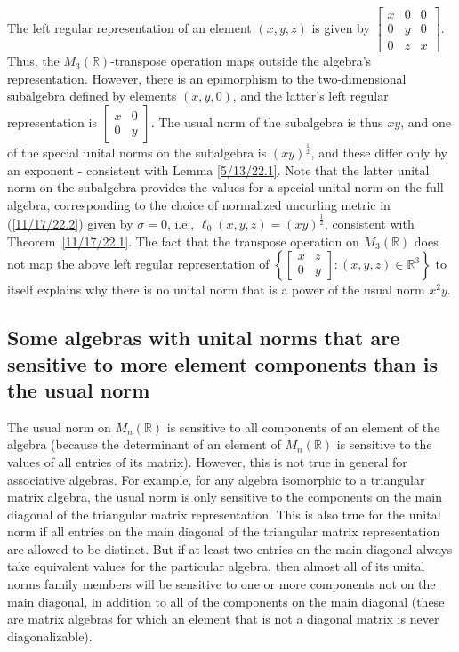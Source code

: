 \documentclass{amsart}
\theoremstyle{definition}
\numberwithin{theorem}{section}
\numberwithin{equation}{section}
\begin{document}
The left regular representation of an element $(x,y,z)$ is given by $\left[\begin{array}{ccc}
x & 0 & 0   \\
 0 & y & 0 \\ 0 & z & x    
\end{array} \right]$.  Thus, the $M_3(\mathbb{R})$-transpose operation maps outside the algebra's representation.  However, there is an epimorphism to the two-dimensional subalgebra defined by elements $(x,y,0)$, and the latter's left regular representation is 
 $\left[\begin{array}{ccc}
x & 0  \\
 0 & y  
\end{array} \right]$.  The usual norm of the subalgebra is thus $xy$, and one of the special unital norms on the subalgebra is $(xy)^{\frac{1}{2}}$, and these differ only by an exponent - consistent with Lemma \ref{5/13/22.1}.   Note that the latter unital norm on the subalgebra provides the values for a special unital norm on the full algebra, corresponding to the choice of normalized uncurling metric in (\ref{11/17/22.2}) given by $\sigma = 0$, i.e., $\ell_0(x,y,z) = (xy)^{\frac{1}{2}}$, consistent with \mbox{Theorem \ref{11/17/22.1}}.  The fact that the transpose operation on $M_3(\mathbb{R})$ does not map the above left regular representation of $\left\{\left[\begin{array}{ccc}
x & z  \\
 0 & y  
\end{array} \right]:(x,y,z)\in \mathbb{R}^3\right\}$ to itself explains why there is no unital norm that is a power of the usual norm $x^2y$.
  
\subsection{Some algebras with unital norms that are sensitive to more element components than is the usual norm}

The usual norm on $ M_n(\mathbb{R})$ is sensitive to all components of an element of the algebra (because the determinant of an element of $M_n(\mathbb{R})$  is sensitive to the values of all entries of its matrix).    However, this is not true in general for associative algebras.  For example, for any algebra isomorphic to a triangular matrix algebra, the usual norm is only sensitive to the components on the main diagonal of the triangular matrix representation.  This is also true for the unital norm if all entries on the main diagonal of the triangular matrix representation are allowed to be distinct.  But if  at least two entries on the main diagonal always take equivalent values for the particular algebra,  then almost all of its unital norms family members will be sensitive to one or more components not on the main diagonal, in addition to all of the components on the main diagonal (these are matrix algebras for which an element that is not a diagonal matrix is never diagonalizable).  
\end{document}
